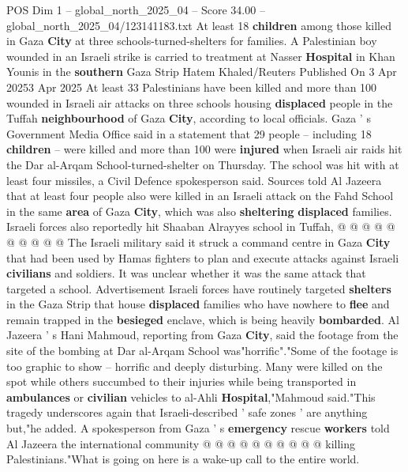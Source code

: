 \begin{textsample}{POS Dim 1 – global\_north\_2025\_04 – Score 34.00 – global\_north\_2025\_04/123141183.txt}  \label{ex:f1_pos_343}
At least 18 \textbf{children} among those killed in Gaza \textbf{City} at three schools-turned-shelters for families.
A Palestinian boy wounded in an Israeli strike is carried to treatment at Nasser \textbf{Hospital} in Khan Younis in the \textbf{southern} Gaza Strip Hatem Khaled/Reuters Published On 3 Apr 20253 Apr 2025 At least 33 Palestinians have been killed and more than 100 wounded in Israeli air attacks on three schools housing \textbf{displaced} people in the Tuffah \textbf{neighbourhood} of Gaza \textbf{City}, according to local officials.
Gaza ' s Government Media Office said in a statement that 29 people -- including 18 \textbf{children} -- were killed and more than 100 were \textbf{injured} when Israeli air raids hit the Dar al-Arqam School-turned-shelter on Thursday.
The school was hit with at least four missiles, a Civil Defence spokesperson said.
Sources told Al Jazeera that at least four people also were killed in an Israeli attack on the Fahd School in the same \textbf{area} of Gaza \textbf{City}, which was also \textbf{sheltering} \textbf{displaced} families.
Israeli forces also reportedly hit Shaaban Alrayyes school in Tuffah, @ @ @ @ @ @ @ @ @ @ The Israeli military said it struck a command centre in Gaza \textbf{City} that had been used by Hamas fighters to plan and execute attacks against Israeli \textbf{civilians} and soldiers.
It was unclear whether it was the same attack that targeted a school.
Advertisement Israeli forces have routinely targeted \textbf{shelters} in the Gaza Strip that house \textbf{displaced} families who have nowhere to \textbf{flee} and remain trapped in the \textbf{besieged} enclave, which is being heavily \textbf{bombarded}.
Al Jazeera ' s Hani Mahmoud, reporting from Gaza \textbf{City}, said the footage from the site of the bombing at Dar al-Arqam School was"horrific"."Some of the footage is too graphic to show -- horrific and deeply disturbing.
Many were killed on the spot while others succumbed to their injuries while being transported in \textbf{ambulances} or \textbf{civilian} vehicles to al-Ahli \textbf{Hospital},"Mahmoud said."This tragedy underscores again that Israeli-described ' safe zones ' are anything but,"he added.
A spokesperson from Gaza ' s \textbf{emergency} rescue \textbf{workers} told Al Jazeera the international community @ @ @ @ @ @ @ @ @ @ killing Palestinians."What is going on here is a wake-up call to the entire world.

\end{textsample}

